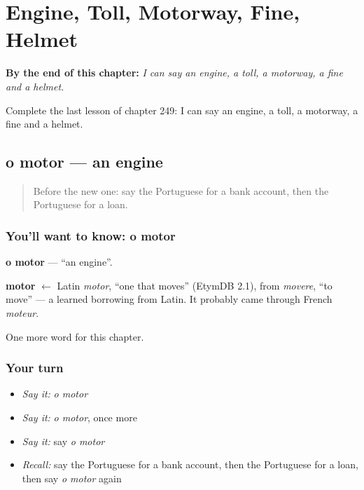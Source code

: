 
\chapter{Engine, Toll, Motorway, Fine, Helmet}
\label{ch:pt-engine-toll-motorway-fine-helmet}

\begin{chapteropening}
\textbf{By the end of this chapter:} \emph{I can say an engine, a toll, a motorway, a fine and a helmet.}

Complete the last lesson of chapter 249: I can say an engine, a toll, a motorway, a fine and a helmet.
\end{chapteropening}

\section[o motor]{o motor — an engine}

\label{lesson:PT-C249-motor}



\begin{quote}
Before the new one: say the Portuguese for a bank account, then the Portuguese for a loan.
\end{quote}

\subsection*{You'll want to know: o motor}
\textbf{o motor} — \textquotedblleft{}an engine\textquotedblright{}.

\begin{cousinweb}
\textbf{motor} $\leftarrow$ Latin \emph{motor}, \textquotedblleft{}one that moves\textquotedblright{} (EtymDB 2.1), from \emph{movere}, \textquotedblleft{}to move\textquotedblright{} — a learned borrowing from Latin. It probably came through French \emph{moteur}.
\end{cousinweb}

\begin{grammarlens}[title={What you've built}]
One more word for this chapter.
\end{grammarlens}

\subsection*{Your turn}
\begin{itemize}
\raggedright
  \item \emph{Say it:} \emph{o motor}
  \item \emph{Say it:} \emph{o motor}, once more
  \item \emph{Say it:} say \emph{o motor}
  \item \emph{Recall:} say the Portuguese for a bank account, then the Portuguese for a loan, then say \emph{o motor} again
\end{itemize}

